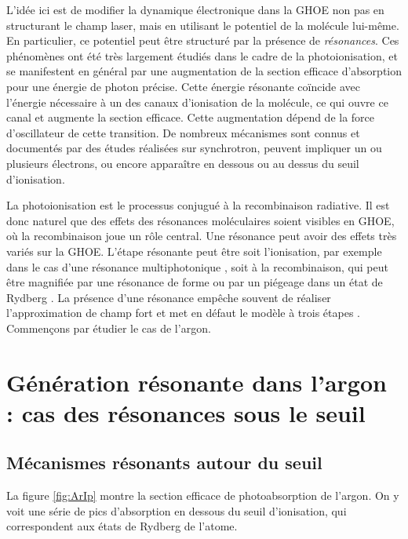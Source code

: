 L'idée ici est de modifier la dynamique électronique dans la GHOE non pas en structurant le champ laser, mais en utilisant le potentiel de la molécule lui-même. En particulier, ce potentiel peut être structuré par la présence de \textit{résonances}. Ces phénomènes ont été très largement étudiés dans le cadre de la photoionisation, et se manifestent en général par une augmentation de la section efficace d'absorption pour une énergie de photon précise. Cette énergie résonante coïncide avec l'énergie nécessaire à un des canaux d'ionisation de la molécule, ce qui ouvre ce canal et augmente la section efficace. Cette augmentation dépend de la force d'oscillateur de cette transition. De nombreux mécanismes sont connus et documentés par des études réalisées sur synchrotron, peuvent impliquer un ou plusieurs électrons, ou encore apparaître en dessous ou au dessus du seuil d'ionisation.

La photoionisation est le processus conjugué à la recombinaison radiative. Il est donc naturel que des effets des résonances moléculaires soient visibles en GHOE, où la recombinaison joue un rôle central. Une résonance peut avoir des effets très variés sur la GHOE. L'étape résonante peut être soit l'ionisation, par exemple dans le cas d'une résonance multiphotonique , soit à la recombinaison, qui peut être magnifiée par une résonance de forme ou par un piégeage dans un état de Rydberg . La présence d'une résonance empêche souvent de réaliser l'approximation de champ fort et met en défaut le modèle à trois étapes . Commençons par étudier le cas de l'argon.

\section{Génération résonante dans l'argon : cas des résonances sous le seuil}
\subsection{Mécanismes résonants autour du seuil}
La figure \ref{fig:ArIp} montre la section efficace de photoabsorption de l'argon. On y voit une série de pics d'absorption en dessous du seuil d'ionisation, qui correspondent aux états de Rydberg de l'atome.

